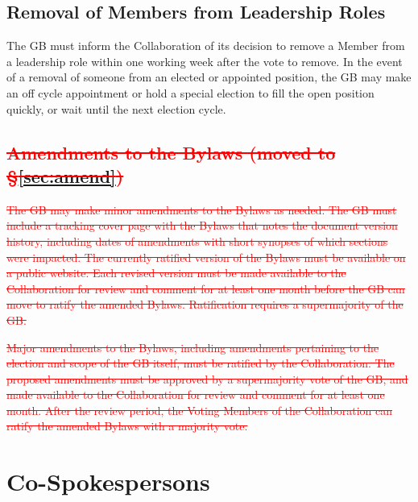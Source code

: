\documentclass[12pt]{article}
\begin{document}
 \subsection{Removal of Members  from Leadership Roles}
 The GB must inform the Collaboration of its decision to remove a Member from a leadership role within one working week after the vote to remove.  In the event of a removal of someone from an elected or appointed position, the GB may make an off cycle appointment or hold a special election to fill the open position quickly, or wait until the next election cycle.  
 
 
\subsection{\textcolor{red} {\sout{Amendments to the Bylaws (moved to \S\ref{sec:amend})}}}
\textcolor{red} {\sout{
\label{subsec:amend}
The GB may make minor amendments to the Bylaws as needed.   The GB must  include a tracking cover page with the Bylaws that notes the document version history, including dates of amendments with short synopses of which sections were impacted.  The currently ratified version of the Bylaws must be available on a public website.  Each revised version must be made available to the Collaboration for review and comment for at least one month before the GB can move to ratify the amended Bylaws.  Ratification requires a supermajority of the GB.}}

\textcolor{red} {\sout{
Major amendments to the Bylaws, including amendments pertaining to the election and scope of the GB itself,  must be ratified by the Collaboration.  The proposed amendments must be approved by a supermajority vote of the GB, and made available to the Collaboration for review and comment for at least one month.  After the review period, the Voting Members of the Collaboration can  ratify the amended Bylaws with a majority vote. }}

\section{Co-Spokespersons}
\label{sec:spokes}
\end{document}
